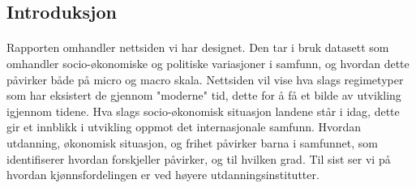 \subsection{Introduksjon}
\paragraph{}
Rapporten omhandler nettsiden vi har designet. Den tar i bruk datasett som omhandler socio-økonomiske og politiske variasjoner i samfunn, og hvordan dette påvirker både på micro og macro skala. 
Nettsiden vil vise hva slags regimetyper som har eksistert de gjennom "moderne" tid, dette for å få et bilde av utvikling igjennom tidene. Hva slags socio-økonomisk situasjon landene står i idag, dette gir et innblikk i utvikling oppmot det internasjonale samfunn. Hvordan utdanning, økonomisk situasjon, og frihet påvirker barna i samfunnet, som identifiserer hvordan forskjeller påvirker, og til hvilken grad. Til sist ser vi på hvordan kjønnsfordelingen er ved høyere utdanningsinstitutter.